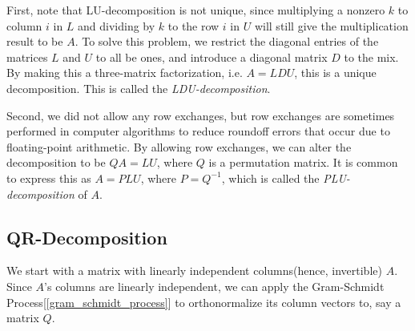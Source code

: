 \documentclass{report}
\begin{document}
			First, note that LU-decomposition is not unique, since multiplying a nonzero $k$ to column $i$ in $L$ and dividing by $k$ to the row $i$ in $U$ will still give the multiplication result to be $A$. To solve this problem, we restrict the diagonal entries of the matrices $L$ and $U$ to all be ones, and introduce a diagonal matrix $D$ to the mix. By making this a three-matrix factorization, i.e. $A=LDU$, this is a unique decomposition. This is called the \emph{LDU-decomposition}.
			
			Second, we did not allow any row exchanges, but row exchanges are sometimes performed in computer algorithms to reduce roundoff errors that occur due to floating-point arithmetic. By allowing row exchanges, we can alter the decomposition to be $QA=LU$, where $Q$ is a permutation matrix. It is common to express this as $A=PLU$, where $P=Q^{-1}$, which is called the \emph{PLU-decomposition} of $A$.
		
		\subsection{QR-Decomposition}
			We start with a matrix with linearly independent columns(hence, invertible) $A$. Since $A$'s columns are linearly independent, we can apply the Gram-Schmidt Process[\ref{gram_schmidt_process}] to orthonormalize its column vectors to, say a matrix $Q$.
			
\end{document}
